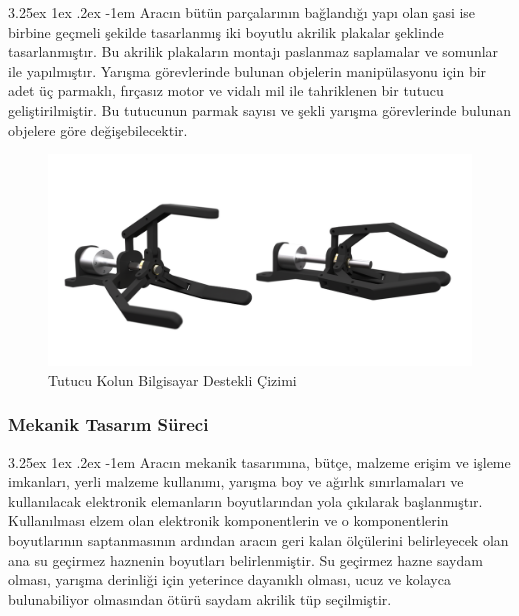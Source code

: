 \documentclass[12pt]{article}
\makeatletter
\renewcommand\paragraph{\@startsection{paragraph}{5}{\z@}%
  {3.25ex \@plus1ex \@minus.2ex}%
  {-1em}%
  {\normalfont\normalsize\bfseries}}
\makeatother
\begin{document}
\newpage

\paragraph{} Aracın bütün parçalarının bağlandığı yapı olan şasi ise birbine geçmeli şekilde tasarlanmış iki boyutlu akrilik plakalar şeklinde tasarlanmıştır. Bu akrilik plakaların montajı paslanmaz saplamalar ve somunlar ile yapılmıştır. Yarışma görevlerinde bulunan objelerin manipülasyonu için bir adet üç parmaklı, fırçasız motor ve vidalı mil ile tahriklenen bir tutucu geliştirilmiştir. Bu tutucunun parmak sayısı ve şekli yarışma görevlerinde bulunan objelere göre değişebilecektir. 

\begin{figure}[hbt!]
\centering
\includegraphics[width=1\textwidth]{images/gripper_render.png}
\caption{Tutucu Kolun Bilgisayar Destekli Çizimi}
\label{fig:gripper}
\end{figure}

\subsubsection{Mekanik Tasarım Süreci}

\paragraph{} Aracın mekanik tasarımına, bütçe, malzeme erişim  ve işleme imkanları, yerli malzeme kullanımı, yarışma boy ve ağırlık sınırlamaları ve kullanılacak elektronik elemanların boyutlarından yola çıkılarak başlanmıştır. Kullanılması elzem olan elektronik komponentlerin ve o komponentlerin boyutlarının saptanmasının ardından aracın geri kalan ölçülerini belirleyecek olan ana su geçirmez haznenin boyutları belirlenmiştir. Su geçirmez hazne saydam olması, yarışma derinliği için yeterince dayanıklı olması, ucuz ve kolayca bulunabiliyor olmasından ötürü saydam akrilik tüp seçilmiştir.
\end{document}
